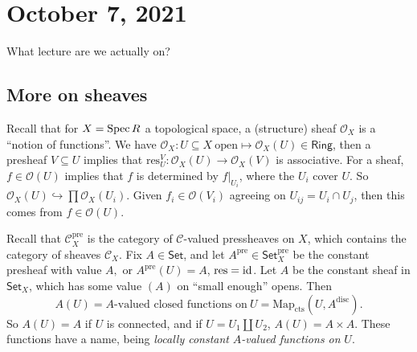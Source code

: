 \section{October 7, 2021} 
What lecture are we actually on?

\subsection{More on sheaves}
Recall that for $X=\operatorname{Spec} R$ a topological space, a (structure) sheaf $\mathcal{O} _X$ is a ``notion of functions''. We have $\mathcal{O} _X \colon U \subseteq X \ \text{open}  \mapsto \mathcal{O} _X(U) \in  \mathsf{Ring} $, then a presheaf $V \subseteq U$ implies that $\mathrm{res}_U^V \colon \mathcal{O} _X(U) \to \mathcal{O} _X(V)$ is associative. For a sheaf, $f \in \mathcal{O} (U)$ implies that $f$ is determined by $\left. f \right| _{U_i }$, where the $U_i $ cover $U$. So $\mathcal{O} _X(U) \hookrightarrow  \prod \mathcal{O} _X (U_i )$. Given $f _i  \in  \mathcal{O} (V_i )$ agreeing on $U _{ij}=U _i  \cap  U_j $, then this comes from $f \in \mathcal{O} (U)$. 

    Recall that $\mathcal{C} _X^{\mathrm{pre}}$ is the category of $\mathcal{C} $-valued pressheaves on $X$, which contains the category of sheaves $\mathcal{C} _X$. Fix $A \in  \mathsf{Set} $, and let $A ^{\mathrm{pre}}\in  \mathsf{Set} _X ^{\mathrm{pre}}$ be the constant presheaf with value $A,$ or $A ^{\mathrm{pre}}(U)=A$, $\mathrm{res}=\operatorname{id}$.  Let $A$ be the constant sheaf in $\mathsf{Set} _X$, which has some value $(A)$ on ``small enough'' opens. Then \[
        A(U)= A\text{-valued closed functions on} \ U = \mathrm{Map}_{\mathrm{cts}}(U,A^{\mathrm{disc}}).
    \] So $A(U) =A$ if $U$ is connected, and if $U=U_1\amalg U_2$, $A(U)= A \times A$. These functions have a name, being \emph{locally constant} $A$\emph{-valued functions on} $U$. 

